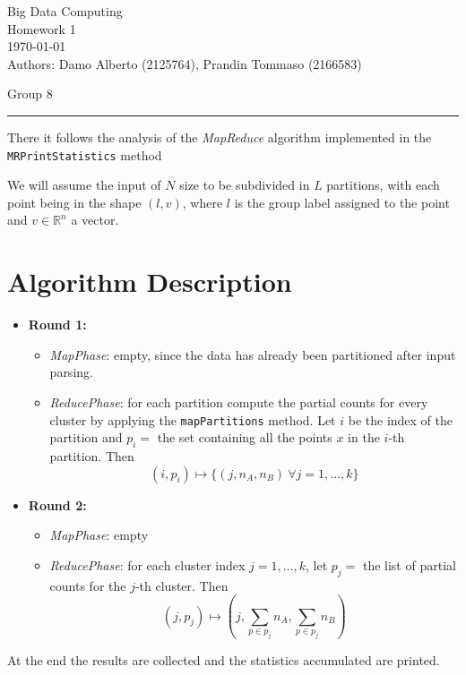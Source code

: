 \documentclass[11pt,letterpaper, onecolumn]{exam}
\begin{document}
\begingroup  
    \centering
    \large Big Data Computing\\
    \large Homework 1\\[0.3em]
    \small \today\\[0.5em]
    \small Authors: Damo Alberto (2125764), Prandin Tommaso (2166583)\par
    \small Group 8\par
\endgroup
\rule{\textwidth}{0.4pt}

There it follows the analysis of the \textit{MapReduce} algorithm implemented in the \texttt{MRPrintStatistics} method

We will assume the input of $N$ size to be subdivided in $L$ partitions, with each point being in the shape $(l, v)$, where $l$ is the group label assigned to the point and $v \in \mathbb{R}^{n}$ a vector.
\section{Algorithm Description}
\begin{itemize}
    \item \textbf{Round 1:}
    \begin{itemize}
        \item \textit{MapPhase}: empty, since the data has already been partitioned after input parsing.
        \item \textit{ReducePhase}: for each partition compute the partial counts for every cluster by applying the \texttt{mapPartitions} method. Let $i$ be the index of the partition and $p_i = $ the set containing all the points $x$ in the $i$-th partition.
        Then
        $$
        (i, p_i) \mapsto \{(j, n_A, n_B)\  \forall j = 1, \dots, k\}
        $$
    \end{itemize}
    \item \textbf{Round 2:}
    \begin{itemize}
        \item \textit{MapPhase}: empty
        \item \textit{ReducePhase}: for each cluster index $j = 1, \dots, k$, let $p_j = $ the list of partial counts for the $j$-th cluster.
        Then
        $$
            (j, p_j) \mapsto (j, \sum_{p \in p_j}n_A, \sum_{p \in p_j}n_B)
        $$
    \end{itemize}
\end{itemize}

At the end the results are collected and the statistics accumulated are printed.
\end{document}
